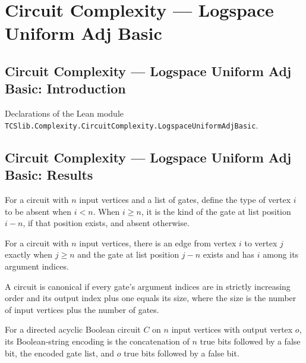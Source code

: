 \section{Circuit Complexity --- Logspace Uniform Adj Basic}
\subsection*{Circuit Complexity --- Logspace Uniform Adj Basic: Introduction}

Declarations of the Lean module \texttt{TCSlib.Complexity.CircuitComplexity.LogspaceUniformAdjBasic}.

\subsection*{Circuit Complexity --- Logspace Uniform Adj Basic: Results}

\begin{definition}
\label{BoolCircuit.DAGCircuit.vtype}
\leanok
{}
For a circuit with $n$ input vertices and a list of gates, define the type of vertex $i$
to be absent when $i<n$. When $i\ge n$, it is the kind of the gate at list position
$i-n$, if that position exists, and absent otherwise.
\end{definition}

\begin{definition}
\label{BoolCircuit.DAGCircuit.Edge}
\leanok
For a circuit with $n$ input vertices, there is an edge from vertex $i$ to vertex $j$
exactly when $j\ge n$ and the gate at list position $j-n$ exists and has $i$ among its
argument indices.
\end{definition}

\begin{definition}
\label{BoolCircuit.DAGCircuit.IsCanonical}
\leanok
{}
A circuit is canonical if every gate’s argument indices are in strictly increasing order
and its output index plus one equals its size, where the size is the number of input
vertices plus the number of gates.
\end{definition}

\begin{lemma}
\label{BoolCircuit.DAGCircuit.encode_eq}
\leanok
{}
For a directed acyclic Boolean circuit $C$ on $n$ input vertices with output vertex $o$,
its Boolean-string encoding is the concatenation of $n$ true bits followed by a false
bit, the encoded gate list, and $o$ true bits followed by a false bit.
\end{lemma}

